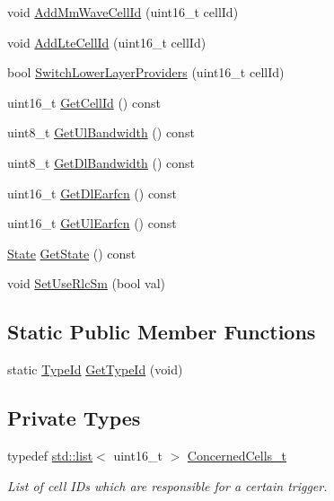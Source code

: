 \begin{DoxyCompactItemize}
\item 
void \hyperlink{classns3_1_1LteUeRrc_aa536f66a00d52134dbc7107df8bf3a78}{Add\+Mm\+Wave\+Cell\+Id} (uint16\+\_\+t cell\+Id)
\item 
void \hyperlink{classns3_1_1LteUeRrc_afb87b599b25bd1dd088400d194064a8c}{Add\+Lte\+Cell\+Id} (uint16\+\_\+t cell\+Id)
\item 
bool \hyperlink{classns3_1_1LteUeRrc_a2334b74442c95c8424d6714c38443f86}{Switch\+Lower\+Layer\+Providers} (uint16\+\_\+t cell\+Id)
\item 
uint16\+\_\+t \hyperlink{classns3_1_1LteUeRrc_a4313c830c88d4b22e5ff25d92785393a}{Get\+Cell\+Id} () const 
\item 
uint8\+\_\+t \hyperlink{classns3_1_1LteUeRrc_a898623655d3d46e183d380e9ef3ec1bb}{Get\+Ul\+Bandwidth} () const 
\item 
uint8\+\_\+t \hyperlink{classns3_1_1LteUeRrc_a186c73553e13ec8169651ce2a53920f1}{Get\+Dl\+Bandwidth} () const 
\item 
uint16\+\_\+t \hyperlink{classns3_1_1LteUeRrc_a2a6aab2f6052608330c5eaace15b04a9}{Get\+Dl\+Earfcn} () const 
\item 
uint16\+\_\+t \hyperlink{classns3_1_1LteUeRrc_a8f06e824830c2b99887f44e05c1b3c22}{Get\+Ul\+Earfcn} () const 
\item 
\hyperlink{classns3_1_1LteUeRrc_a241012c291e75681150c9214e11f6145}{State} \hyperlink{classns3_1_1LteUeRrc_a210e6b24351dd2f6cae3386ea07a0886}{Get\+State} () const 
\item 
void \hyperlink{classns3_1_1LteUeRrc_a32c86230a47f4bc2960944360e0acf36}{Set\+Use\+Rlc\+Sm} (bool val)
\end{DoxyCompactItemize}
\subsection*{Static Public Member Functions}
\begin{DoxyCompactItemize}
\item 
static \hyperlink{classns3_1_1TypeId}{Type\+Id} \hyperlink{classns3_1_1LteUeRrc_accc602839ad1d8fda3f50944e4426b57}{Get\+Type\+Id} (void)
\end{DoxyCompactItemize}
\subsection*{Private Types}
\begin{DoxyCompactItemize}
\item 
typedef \hyperlink{openflow-interface_8h_afd9bcfa176617760671b67580f536fa7}{std\+::list}$<$ uint16\+\_\+t $>$ \hyperlink{classns3_1_1LteUeRrc_abe2ee6e993c02a8e5e924bc777e3fa5c}{Concerned\+Cells\+\_\+t}
\begin{DoxyCompactList}\small\item\em List of cell I\+Ds which are responsible for a certain trigger. \end{DoxyCompactList}\end{DoxyCompactItemize}
